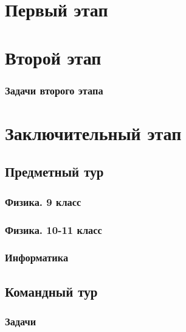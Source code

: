 \documentclass[a4paper,12pt,oneside]{book}
\begin{document}

\setcounter{tocdepth}{1}

\tableofcontents

\part{Первый этап}




\part{Второй этап}
\section{Задачи второго этапа}


\part{Заключительный этап}

\clearpage
\chapter{Предметный тур}

\section{Физика. 9 класс}


\section{Физика. 10-11 класс}


\section{Информатика}
%

\chapter{Командный тур}
\section{Задачи}
\end{document}
